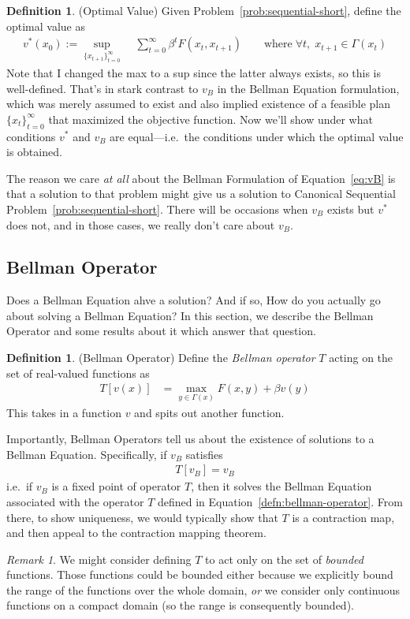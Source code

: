 \documentclass[12pt]{article}
\numberwithin{equation}{section} %
\theoremstyle{plain}
\theoremstyle{definition}
\newtheorem{defn}[thm]{Definition}
\theoremstyle{remark}
\newtheorem*{rmk}{Remark}
\newcommand{\R}{\mathbb{R}}
\newcommand{\sumtinfz}{\sum^\infty_{t=0}}
\begin{document}
\begin{defn}{(Optimal Value)}
\label{defn:vstar}
Given Problem~\ref{prob:sequential-short}, define the optimal value as
\begin{align}
  v^*(x_0) := \sup_{\{x_{t+1}\}_{t=0}^\infty}
  \; &\sumtinfz \beta^t F(x_t,x_{t+1})
  \qquad \text{where}\;
  \forall t, \; x_{t+1} \in \Gamma(x_t)
\end{align}
Note that I changed the max to a sup since the latter always exists, so
this is well-defined. That's in stark contrast to $v_B$ in the Bellman
Equation formulation, which was merely assumed to exist and also implied
existence of a feasible plan $\{x_t\}_{t=0}^\infty$ that maximized the
objective function. Now we'll show under what conditions $v^*$ and $v_B$
are equal---i.e.\ the conditions under which the optimal value is
obtained.

The reason we care \emph{at all} about the Bellman Formulation of
Equation~\ref{eq:vB} is that a solution to that problem might give us a
solution to Canonical Sequential Problem~\ref{prob:sequential-short}.
There will be occasions when $v_B$ exists but $v^*$ does not, and in
those cases, we really don't care about $v_B$.
\end{defn}


\clearpage
\subsection{Bellman Operator}

Does a Bellman Equation ahve a solution? And if so, How do you actually
go about solving a Bellman Equation? In this section, we describe the
Bellman Operator and some results about it which answer that question.


\begin{defn}(Bellman Operator)
Define the \emph{Bellman operator} $T$
acting on the set of real-valued functions as
\begin{align}
  T[v(x)]
  &= \max_{y\in\Gamma(x)}
  F(x,y) + \beta v(y)
  \label{defn:bellman-operator}
\end{align}
This takes in a function $v$ and spits out another function.

Importantly, Bellman Operators tell us about the existence of solutions
to a Bellman Equation. Specifically, if $v_B$ satisfies
\begin{align*}
  T[v_B] = v_B
\end{align*}
i.e.\ if $v_B$ is a fixed point of operator $T$, then it solves the
Bellman Equation associated with the operator $T$ defined in
Equation~\ref{defn:bellman-operator}.
From there, to show uniqueness, we would typically show that $T$ is a
contraction map, and then appeal to the contraction mapping theorem.
\end{defn}
\begin{rmk}
We might consider defining $T$ to act only on the set of \emph{bounded}
functions. Those functions could be bounded either because we explicitly
bound the range of the functions over the whole domain, \emph{or} we
consider only continuous functions on a compact domain (so the range is
consequently bounded).
\end{rmk}
\end{document}
